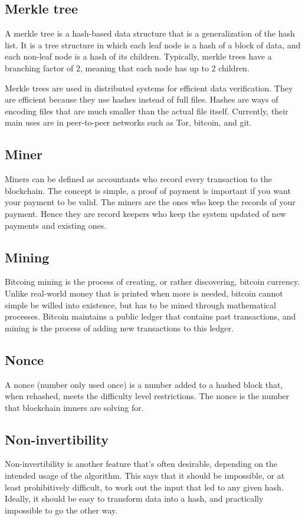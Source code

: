 \documentclass{article}
\begin{document}
\subsection{Merkle tree}
A merkle tree is a hash-based data structure that is a generalization of the
hash list. It is a tree structure in which each leaf node is a hash of a block
of data, and each non-leaf node is a hash of its children. Typically, merkle
trees have a branching factor of 2, meaning that each node has up to 2
children.

Merkle trees are used in distributed systems for efficient data verification.
They are efficient because they use hashes instead of full files. Hashes are
ways of encoding files that are much smaller than the actual file itself.
Currently, their main uses are in peer-to-peer networks such as Tor, bitcoin,
and git.

\subsection{Miner}
Miners can be defined as accountants who record every transaction to the
blockchain. The concept is simple, a proof of payment is important if you want
your payment to be valid. The miners are the ones who keep the records of your
payment. Hence they are record keepers who keep the system updated of new
payments and existing ones.

\subsection{Mining}
Bitcoing mining is the process of creating, or rather discovering, bitcoin
currency. Unlike real-world money that is printed when more is needed, bitcoin
cannot simple be willed into existence, but has to be mined through
mathematical processes. Bitcoin maintains a public ledger that contains past
transactions, and mining is the process of adding new transactions to this
ledger.

\subsection{Nonce}
A nonce (number only used once) is a number added to a hashed block that, when
rehashed, meets the difficulty level restrictions. The nonce is the number that
blockchain imners are solving for.

\subsection{Non-invertibility}
Non-invertibility is another feature that's often desirable, depending on the
intended usage of the algorithm. This says that it should be impossible, or at
least prohibitively difficult, to work out the input that led to any given
hash. Ideally, it should be easy to transform data into a hash, and practically
impossible to go the other way.
\end{document}
